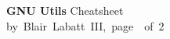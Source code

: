 \documentclass[10pt,landscape]{article}
\newcommand{\header}{
\begin{mdframed}[]
\footnotesize
\sffamily
\Large{\textbf{GNU Utils}} \footnotesize Cheatsheet\\
by~Blair~Labatt~III,~page~\thepage~of~2
\end{mdframed}
}
\begin{document}
\small
\begin{multicols*}{4}
\header










%






\vfill
\,


\end{multicols*}
\end{document}
